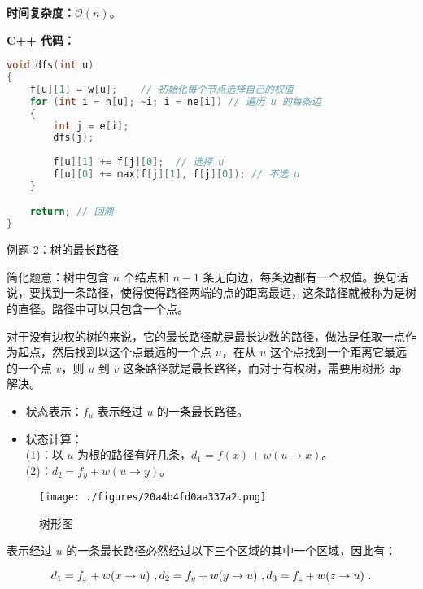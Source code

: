 \textbf{时间复杂度：}$\mathcal{O}(n)$。

\textbf{C++ 代码：}

\begin{lstlisting}[language=cpp]
void dfs(int u)
{
    f[u][1] = w[u];    // 初始化每个节点选择自己的权值
    for (int i = h[u]; ~i; i = ne[i]) // 遍历 u 的每条边
    {
        int j = e[i];
        dfs(j);
        
        f[u][1] += f[j][0];  // 选择 u
        f[u][0] += max(f[j][1], f[j][0]); // 不选 u
    }

    return; // 回溯
}

\end{lstlisting}

\href{https://www.luogu.com.cn/problem/SP1437}{例题 $2$：树的最长路径}

简化题意：树中包含 $n$ 个结点和 $n-1$ 条无向边，每条边都有一个权值。换句话说，要找到一条路径，使得使得路径两端的点的距离最远，这条路径就被称为是树的直径。路径中可以只包含一个点。

对于没有边权的树的来说，它的最长路径就是最长边数的路径，做法是任取一点作为起点，然后找到以这个点最远的一个点 $u$，在从 $u$ 这个点找到一个距离它最远的一个点 $v$，则 $u$ 到 $v$ 这条路径就是最长路径，而对于有权树，需要用树形 $\tt dp$ 解决。

\begin{itemize}
\item 状态表示：$f_u$ 表示经过 $u$ 的一条最长路径。
\end{itemize}

\begin{itemize}
\item 状态计算： \\
    (1)：以 $u$ 为根的路径有好几条，$d_1 = f(x) + w(u \to x)$。 \\
    (2)：$d_2 = f_y + w(u \to y)$。
\end{itemize}

\begin{figure}[ht]
\centering
\texttt{[image: ./figures/20a4b4fd0aa337a2.png]}
\caption{树形图} \label{fig_dp2_1}
\end{figure}

表示经过 $u$ 的一条最长路径必然经过以下三个区域的其中一个区域，因此有：

\begin{equation}
d_1 = f_x + w(x \to u)~, \\
d_2 = f_y + w(y \to u)~, \\
d_3 = f_z + w(z \to u)~. \\
\end{equation}

